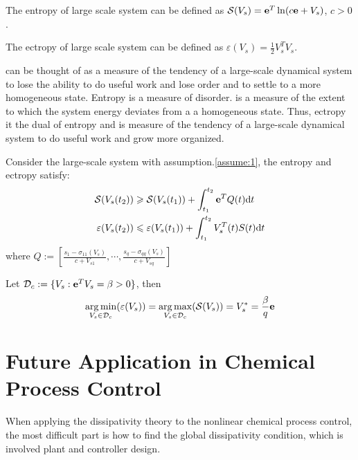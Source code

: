 \documentclass{paper}
\begin{document}
\begin{defi}
The entropy of large scale system can be defined as $\mathcal{S}(V_s)=\textbf{e}^T\ln (c\textbf{e}+V_s)$, $c>0$.
\end{defi}
\begin{defi}
The ectropy of large scale system can be defined as $\varepsilon(V_s)=\frac{1}{2}V_s^TV_s$.
\end{defi}
\begin{note}
 can be thought of as a measure of the tendency of a large-scale dynamical system to lose the
ability to do useful work and lose order and to settle to a more homogeneous state. Entropy is a measure of
disorder.  is a measure of the extent to which the system energy deviates from a a homogeneous 
state. Thus, ectropy it the dual of entropy and is measure of the tendency of a large-scale dynamical system 
to do useful work and grow more organized.
\end{note}
\begin{thm}
Consider the large-scale system with assumption.\ref{assume:1}, the entropy and ectropy satisfy:
\begin{align}
\mathcal{S}(V_s(t_2))&\geqslant \mathcal{S}(V_s(t_1))+\int_{t_1}^{t_2}\textbf{e}^TQ(t)\text{d} t \\
\varepsilon(V_s(t_2))&\leqslant\varepsilon(V_s(t_1))+\int_{t_1}^{t_2}V_s^T(t)S(t)\text{d} t
\end{align}
where $Q:=\left[\frac{s_1-\sigma_{11}(V_s)}{c+V_{s1}},\cdots,\frac{s_q-\sigma_{qq}(V_s)}{c+V_{sq}}\right]$
\end{thm}
\begin{lem}
Let $\mathcal{D}_c:=\{V_s:\textbf{e}^TV_s=\beta>0\}$, then 
\begin{equation}
\underset{V_s\in\mathcal{D}_c}{\arg\min}(\varepsilon(V_s))=\underset{V_s\in\mathcal{D}_c}{\arg\max}(\mathcal{S}(V_s))=V_s^*=\frac{\beta}{q}\textbf{e}
\end{equation}
\end{lem}
\section{Future Application in Chemical Process Control}
When applying the dissipativity theory to the nonlinear chemical process control, the most difficult part is
how to find the global dissipativity condition, which is involved plant and controller design. 
\end{document}
